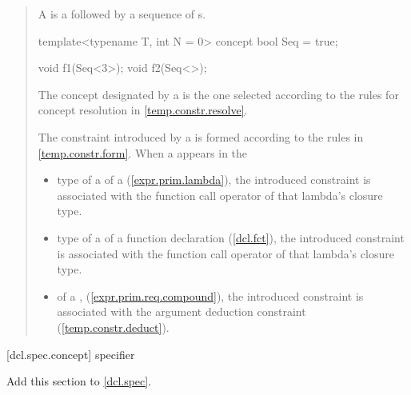 \begin{quote}
\pnum
A  is a  followed 
by a sequence of s.
%
\enterexample
\begin{codeblock}
template<typename T, int N = 0> concept bool Seq = true;

void f1(Seq<3>);
void f2(Seq<>);
\end{codeblock}
\exitexample

\pnum
The concept designated by a 
is the one selected according to the rules for concept resolution in
\ref{temp.constr.resolve}.

\pnum
The constraint introduced by a 
is formed according to the rules in \ref{temp.constr.form}. 
% 
When a  appears in the
\begin{itemize}
\item type of a  of a 
 (\ref{expr.prim.lambda}), the introduced 
constraint is associated with the function call operator of that lambda's 
closure type.

\item type of a  of a 
function declaration (\ref{dcl.fct}), the introduced constraint is 
associated with the function call operator of that lambda's closure type.

\item {} of a ,
(\ref{expr.prim.req.compound}), the introduced constraint is associated with
the argument deduction constraint (\ref{temp.constr.deduct}).
\end{itemize}
\end{quote}


[dcl.spec.concept]{ specifier}

Add this section to \ref{dcl.spec}.

